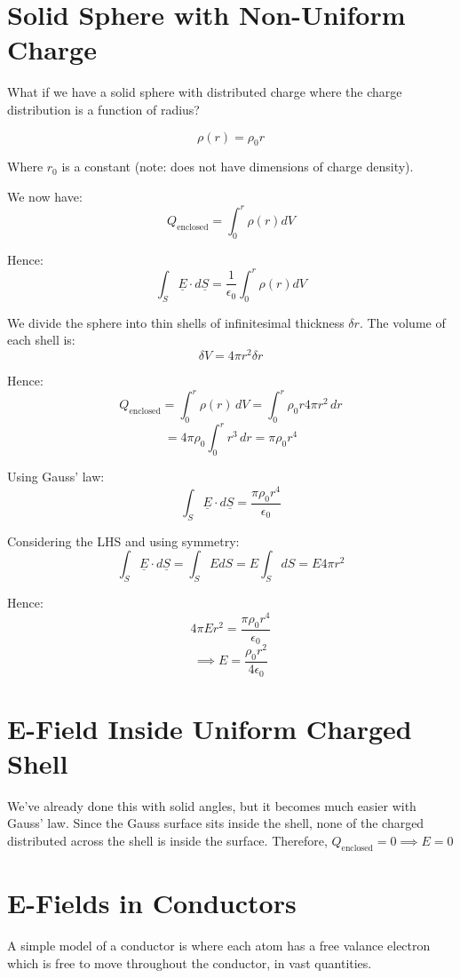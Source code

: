 
\section{Solid Sphere with Non-Uniform Charge}
What if we have a solid sphere with distributed charge where the charge distribution is a function of radius?

\[
    \rho(r) = \rho_0 r
\]

Where $r_0$ is a constant (note: does not have dimensions of charge density).


We now have:
\[
    Q_\text{enclosed} = \int_0^r \rho(r) dV
\]

Hence:
\[
    \int_{S} \underline{E} \cdot d \underline{S} = \frac{1}{\epsilon_0} \int_0^r \rho(r) dV
\]

We divide the sphere into thin shells of infinitesimal thickness $\delta r$. The volume of each shell is:
\[
    \delta V = 4 \pi r^2 \delta r
\]

Hence:
\[
    Q_\text{enclosed} = \int_{0}^{r} \rho(r) \, dV = \int_{0}^{r} \rho_0 r 4 \pi r^2 \, dr
\]
\[
    = 4 \pi \rho_0 \int_{0}^{r} r^3 \, dr = \pi \rho_0 r^4
\]

Using Gauss' law:
\[
    \int_S \underline{E} \cdot d \underline{S} = \frac{\pi \rho_0 r^4}{\epsilon_0}
\]

Considering the LHS and using symmetry:
\[
    \int_S \underline{E} \cdot d \underline{S} = \int_S E dS = E \int_S dS = E 4 \pi r^2
\]

Hence:
\[
    4 \pi E r^2 = \frac{\pi \rho_0 r^4}{\epsilon_0}
\]
\[
    \implies E = \frac{\rho_0 r^2}{4 \epsilon_0}
\]

\section{E-Field Inside Uniform Charged Shell}
We've already done this with solid angles, but it becomes much easier with Gauss' law. Since the Gauss surface sits inside the shell, none of the charged distributed across the shell is inside the surface. Therefore, $Q_\text{enclosed} = 0 \implies E = 0$

\section{E-Fields in Conductors}
A simple model of a conductor is where each atom has a free valance electron which is free to move throughout the conductor, in vast quantities.

